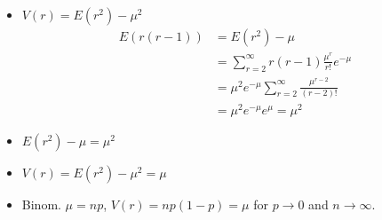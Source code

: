 \begin{itemize}
    \item $V(r) = E(r^2) - \mu^2$
          \begin{align*}
              E(r(r-1)) & = E(r^2) - \mu                                                \\
                        & = \sum_{r=2}^{\infty} r(r-1) \frac{\mu^r}{r!} e^{-\mu}        \\
                        & = \mu^2 e^{-\mu} \sum_{r=2}^{\infty} \frac{\mu^{r-2}}{(r-2)!} \\
                        & = \mu^2 e^{-\mu} e^{\mu} = \mu^2
          \end{align*}

    \item $E(r^2) - \mu = \mu^2 $
    \item $V(r) = E(r^2) - \mu^2 = \mu $
    \item Binom. $\mu = np$, $V(r) = np(1-p)=\mu$ for $p \rightarrow 0$ and $n \rightarrow \infty$.
\end{itemize}
